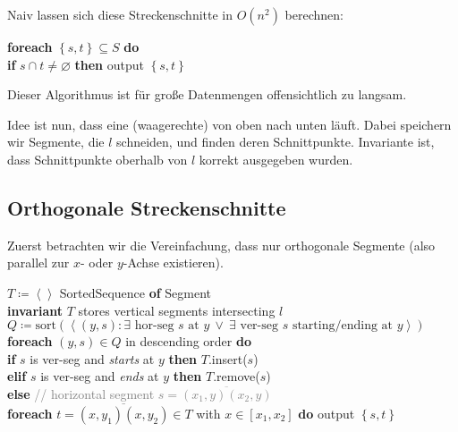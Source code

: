 Naiv lassen sich diese Streckenschnitte in \( O(n^2) \) berechnen:

\begin{pseudocode}
  \textbf{foreach} \( \left \{ s,t \right \} \subseteq S \) \textbf{do} \\
  \phantom{\enskip} \textbf{if} \( s \cap t \neq \varnothing \) \textbf{then} output \( \left \{ s,t \right \} \)
\end{pseudocode}

Dieser Algorithmus ist für große Datenmengen offensichtlich zu langsam.

Idee ist nun, dass eine (waagerechte)  von oben nach unten läuft. Dabei speichern wir Segmente, die \( l \) schneiden, und finden deren Schnittpunkte. Invariante ist, dass Schnittpunkte oberhalb von \( l \) korrekt ausgegeben wurden.

\subsection{Orthogonale Streckenschnitte}

Zuerst betrachten wir die Vereinfachung, dass nur orthogonale Segmente (also parallel zur \( x \)- oder \( y \)-Achse existieren).

\begin{pseudocode}
  \( T \coloneqq \left\langle  \right\rangle \) SortedSequence \textbf{of} Segment \\
  \textbf{invariant} \( T \) stores vertical segments intersecting \( l \) \\
  \( Q \coloneqq \text{sort}(\left\langle (y,s) : \exists \text{ hor-seg } s \text{ at } y \ \vee \ \exists \text{ ver-seg } s \text{ starting/ending at } y \right\rangle) \) \\
  \textbf{foreach} \( (y,s) \in Q \) in descending order \textbf{do} \\
  \phantom{\enskip} \textbf{if} \phantom{\enskip} \( s \) is ver-seg and \emph{starts} at \( y \) \textbf{then} \( T \).insert(\( s \)) \\
  \phantom{\enskip} \textbf{elif} \( s \) is ver-seg and \emph{ends} at \( y \) \textbf{then} \( T \).remove(\( s \)) \\
  \phantom{\enskip} \textbf{else} \phantom{\enskip} \textcolor{gray}{// horizontal segment \( s = \overline{(x_1,y)(x_2,y)} \)} \\
  \phantom{\enskip} \phantom{\enskip} \textbf{foreach} \( t = \overline{(x, y_1)(x,y_2)} \in T \) with \( x \in [x_1, x_2] \) \textbf{do} output \( \left \{ s,t \right \} \)
\end{pseudocode}

